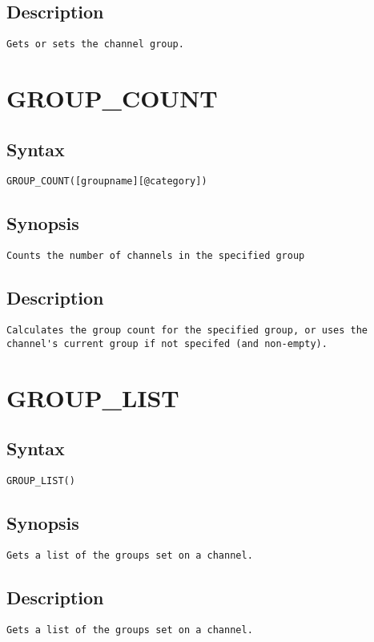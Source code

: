 \subsection{Description}
\begin{verbatim}
Gets or sets the channel group.

\end{verbatim}


\section{GROUP\_COUNT}
\subsection{Syntax}
\begin{verbatim}
GROUP_COUNT([groupname][@category])
\end{verbatim}
\subsection{Synopsis}
\begin{verbatim}
Counts the number of channels in the specified group
\end{verbatim}
\subsection{Description}
\begin{verbatim}
Calculates the group count for the specified group, or uses the
channel's current group if not specifed (and non-empty).

\end{verbatim}


\section{GROUP\_LIST}
\subsection{Syntax}
\begin{verbatim}
GROUP_LIST()
\end{verbatim}
\subsection{Synopsis}
\begin{verbatim}
Gets a list of the groups set on a channel.
\end{verbatim}
\subsection{Description}
\begin{verbatim}
Gets a list of the groups set on a channel.

\end{verbatim}


